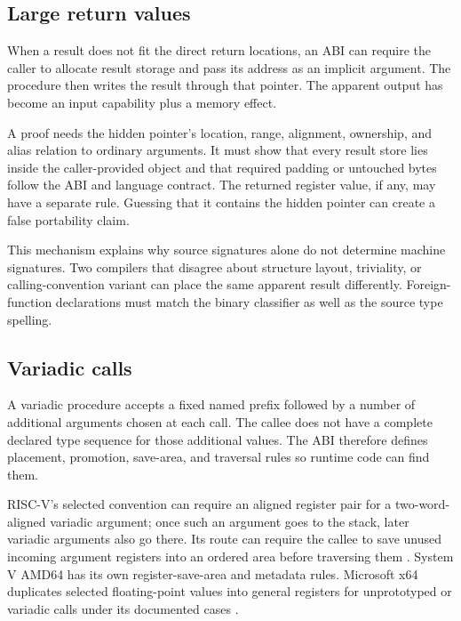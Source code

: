 \subsection{Large return values}

When a result does not fit the direct return locations, an ABI can require the
caller to allocate result storage and pass its address as an implicit argument.
The procedure then writes the result through that pointer. The apparent output
has become an input capability plus a memory effect.

A proof needs the hidden pointer's location, range, alignment, ownership, and
alias relation to ordinary arguments. It must show that every result store lies
inside the caller-provided object and that required padding or untouched bytes
follow the ABI and language contract. The returned register value, if any, may
have a separate rule. Guessing that it contains the hidden pointer can create
a false portability claim.

This mechanism explains why source signatures alone do not determine machine
signatures. Two compilers that disagree about structure layout, triviality, or
calling-convention variant can place the same apparent result differently.
Foreign-function declarations must match the binary classifier as well as the
source type spelling.

\subsection{Variadic calls}

A variadic procedure accepts a fixed named prefix followed by a
number of additional arguments chosen at each call. The callee does not have a
complete declared type sequence for those additional values. The ABI therefore
defines placement, promotion, save-area, and traversal rules so runtime code
can find them.

RISC-V's selected convention can require an aligned register pair for a
two-word-aligned variadic argument; once such an argument goes to the stack,
later variadic arguments also go there. Its  route can require
the callee to save unused incoming argument registers into an ordered area
before traversing them \autocite{riscv2026abi}. System V AMD64 has its own
register-save-area and metadata rules. Microsoft x64 duplicates selected
floating-point values into general registers for unprototyped or variadic
calls under its documented cases \autocite{microsoft2025x64abi}.

